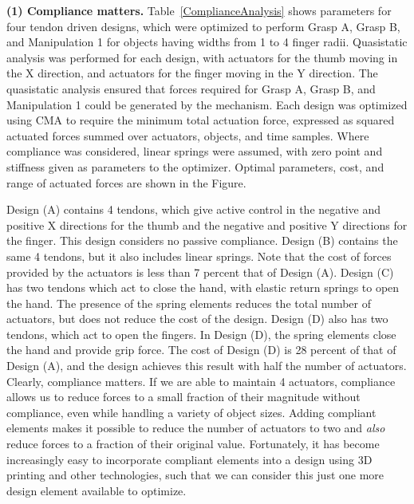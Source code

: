 \smallskip\noindent
{\bf (1) Compliance matters.}  Table~\ref{ComplianceAnalysis} shows parameters for four tendon driven designs, which were optimized to perform Grasp A, Grasp B, and Manipulation 1 for objects  having widths from 1 to 4 finger radii.   Quasistatic analysis was performed for each design, with actuators for the thumb moving in the X direction, and actuators for the finger moving in the Y direction.  The quasistatic analysis ensured that forces required for Grasp A, Grasp B, and Manipulation 1 could be generated by the mechanism.   Each design was optimized using CMA \cite{hansen2006cma} to require the minimum total actuation force, expressed as squared actuated forces summed over actuators, objects, and time samples.    Where compliance was considered, linear springs were assumed, with zero point and stiffness given as parameters to the optimizer.   Optimal parameters, cost, and range of actuated forces are shown in the Figure.

Design (A) contains 4 tendons, which give active control in the negative and positive X directions for the thumb and the negative and positive Y directions for the finger.   This design considers no passive compliance.   Design (B) contains the same 4 tendons, but it also includes linear springs.   Note that the cost of forces provided by the actuators is less than 7 percent that of Design (A).    Design (C) has two tendons which act to close the hand, with elastic return springs to open the hand.    The presence of the spring elements reduces the total number of actuators, but does not reduce the cost of the design.    Design (D) also has two tendons, which act to open the fingers.    In Design (D), the spring elements close the hand and provide grip force.  The cost of Design (D) is 28 percent of that of Design (A), and the design achieves this result with half the number of actuators.    Clearly, compliance matters.   If we are able to maintain 4 actuators, compliance allows us to reduce forces to a small fraction of their magnitude without compliance, even while handling a variety of object sizes.   Adding compliant elements makes it possible to reduce the number of actuators to two and {\it also} reduce forces to a fraction of their original value.  Fortunately, it has become increasingly easy to incorporate compliant elements into a design using 3D printing and other technologies, such that we can consider this just one more design element available to optimize.

